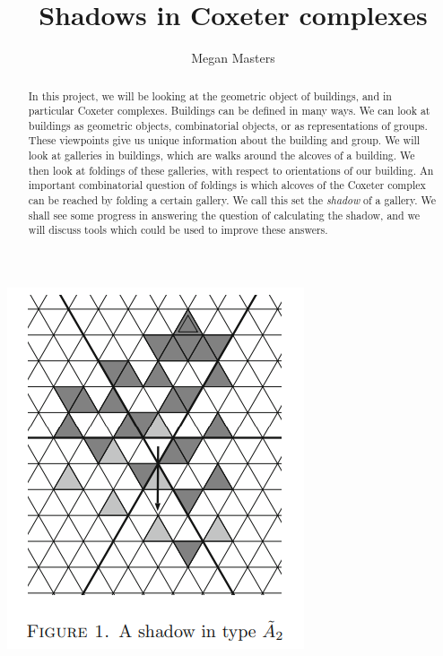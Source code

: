 \documentclass[11pt]{article}
\begin{document}
\newtheorem{theorem}{Theorem}
\theoremstyle{definition}
\newtheorem{definition}{Definition}
\newtheorem{proposition}{Proposition}
\newtheorem{example}{Example}
\newtheorem{lemma}{Lemma}
\newtheorem{corollary}{Corollary}
\newcommand{\uw}{\mathcal{U}(W,X)}
\newcommand{\W}{$(W,S)$}
\newcommand{\ix}{\textit}
\newcommand{\tr}{\textcolor{red}}
\newcommand{\sg}{$\Sigma$}


\title{Shadows in Coxeter complexes}
\author{Megan Masters}
\maketitle



\begin{abstract}
    


In this project, we will be looking at the geometric object of buildings, and in particular Coxeter complexes. Buildings can be defined in many ways. We can look at buildings as geometric objects, combinatorial objects, or as representations of groups. These viewpoints give us unique information about the building and group. We will look at galleries in buildings, which are walks around the alcoves of a building. We then look at foldings of these galleries, with respect to orientations of our building. An important combinatorial question of foldings is which alcoves of the Coxeter complex can be reached by folding a certain gallery. We call this set the \ix{shadow} of a gallery. We shall see some progress in answering the question of calculating the shadow, and we will discuss tools which could be used to improve these answers. 

\end{abstract}
\begin{center}
    \includegraphics[scale=1.5]{Screenshot 2023-03-28 114049.png}\\
\end{center}
\newpage
\tableofcontents
\newpage
{}
\end{document}
